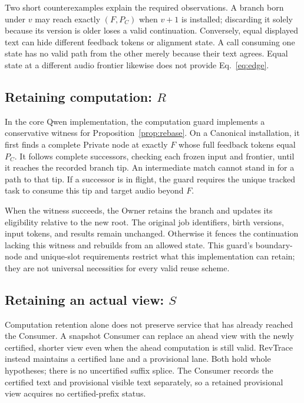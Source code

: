 Two short counterexamples explain the required observations. A branch born
under $v$ may reach exactly $(F,P_C)$ when $v+1$ is installed; discarding it
solely because its version is older loses a valid continuation. Conversely,
equal displayed text can hide different feedback tokens or alignment state.
A call consuming one state has no valid path from the other merely because
their text agrees. Equal state at a different audio frontier likewise does
not provide Eq.~\eqref{eq:edge}.

\subsection{Retaining computation: \texorpdfstring{$R$}{R}}
In the core Qwen implementation, the computation guard implements a conservative witness for
Proposition~\ref{prop:rebase}. On a Canonical installation, it first finds a
complete Private node at exactly $F$ whose full feedback tokens equal
$P_C$. It follows complete successors, checking each frozen input and
frontier, until it reaches the recorded branch tip. An intermediate match
cannot stand in for a path to that tip. If a successor is in flight, the
guard requires the unique tracked task to consume this tip and target
audio beyond $F$.

When the witness succeeds, the Owner retains the branch and updates its
eligibility relative to the new root. The original job identifiers, birth
versions, input tokens, and results remain unchanged. Otherwise it fences
the continuation lacking this witness and rebuilds from an allowed state. This
guard's boundary-node and unique-slot requirements restrict what this
implementation can retain; they are not universal necessities for every
valid reuse scheme.

\subsection{Retaining an actual view: \texorpdfstring{$S$}{S}}
Computation retention alone does not preserve service that has already
reached the Consumer. A snapshot Consumer can replace an ahead view with
the newly certified, shorter view even when the ahead computation is still
valid. RevTrace instead maintains a certified lane and a provisional lane.
Both hold whole hypotheses; there is no uncertified suffix splice. The
Consumer records the certified text and provisional visible text separately,
so a retained provisional view acquires no certified-prefix status.

